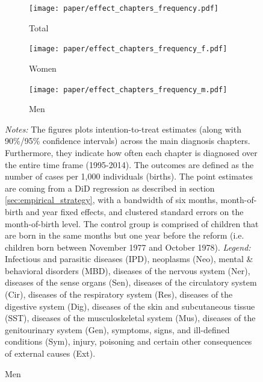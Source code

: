 \documentclass[11pt, a4paper,draft]{article} %
\begin{document}
\begin{landscape}
	\vspace*{\fill}
	\begin{figure}[H]\centering
		\caption{Intention-to-treat effects across \textbf{main diagnosis chapters}}\label{fig: DD_across_main chapters}
		\begin{subfigure}[h]{0.31\linewidth}\centering\caption{Total}
			\texttt{[image: paper/effect\_chapters\_frequency.pdf]}
		\end{subfigure}
		\begin{subfigure}[h]{0.31\linewidth}\centering\caption{Women}
			\texttt{[image: paper/effect\_chapters\_frequency\_f.pdf]}
		\end{subfigure}
		\begin{subfigure}[h]{0.31\linewidth}\centering\caption{Men}
			\texttt{[image: paper/effect\_chapters\_frequency\_m.pdf]}
		\end{subfigure}
		\scriptsize
		\begin{minipage}{\linewidth}
			\emph{Notes:} The figures plots intention-to-treat estimates (along with 90\%/95\% confidence intervals) across the main diagnosis chapters. Furthermore, they indicate how often each chapter is diagnosed over the entire time frame (1995-2014). The outcomes are defined as the number of cases per 1,000 individuals (births). The point estimates are coming from a DiD regression as described in section \ref{sec:empirical_strategy}, with a bandwidth of six months, month-of-birth and year fixed effects, and clustered standard errors on the month-of-birth level. The control group is comprised of children	that are born in the same months but one year before the reform (i.e. children born between November 1977 and October 1978). \newline
			\emph{Legend:} Infectious and parasitic diseases (IPD), neoplasms (Neo), mental \& behavioral disorders (MBD), diseases of the nervous system (Ner), diseases of the sense organs (Sen), diseases of the circulatory system (Cir), diseases of the respiratory system (Res), diseases of the digestive system (Dig), diseases of the skin and subcutaneous tissue (SST), diseases of the musculoskeletal system (Mus), diseases of the genitourinary system (Gen), symptoms, signs, and ill-defined conditions (Sym), injury, poisoning and certain other consequences of external causes (Ext).
			
		\end{minipage}
	\end{figure}
	\vspace*{\fill}\clearpage
\end{landscape}
\end{document}
